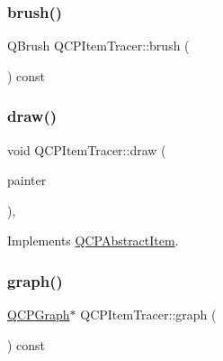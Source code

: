 \subsubsection{\texorpdfstring{brush()}{brush()}}
{\footnotesize\ttfamily Q\+Brush Q\+C\+P\+Item\+Tracer\+::brush (\begin{DoxyParamCaption}{ }\end{DoxyParamCaption}) const\hspace{0.3cm}{\ttfamily [inline]}}

\mbox{\label{class_q_c_p_item_tracer_a11f187ffea436434f3b5cfc387811967}} 
\subsubsection{\texorpdfstring{draw()}{draw()}}
{\footnotesize\ttfamily void Q\+C\+P\+Item\+Tracer\+::draw (\begin{DoxyParamCaption}\item[{\mbox{\hyperlink{class_q_c_p_painter}{Q\+C\+P\+Painter}} $\ast$}]{painter }\end{DoxyParamCaption})\hspace{0.3cm}{\ttfamily [protected]}, {\ttfamily [virtual]}}



Implements \mbox{\hyperlink{class_q_c_p_abstract_item_a007fdab79c935a5da5aa04a21d268c18}{Q\+C\+P\+Abstract\+Item}}.

\mbox{\label{class_q_c_p_item_tracer_ac6526e3e1fff79894f034823461b138a}} 
\subsubsection{\texorpdfstring{graph()}{graph()}}
{\footnotesize\ttfamily \mbox{\hyperlink{class_q_c_p_graph}{Q\+C\+P\+Graph}}$\ast$ Q\+C\+P\+Item\+Tracer\+::graph (\begin{DoxyParamCaption}{ }\end{DoxyParamCaption}) const\hspace{0.3cm}{\ttfamily [inline]}}

\mbox{\label{class_q_c_p_item_tracer_ac39a0791109588d11bb97cd643da2470}} 
